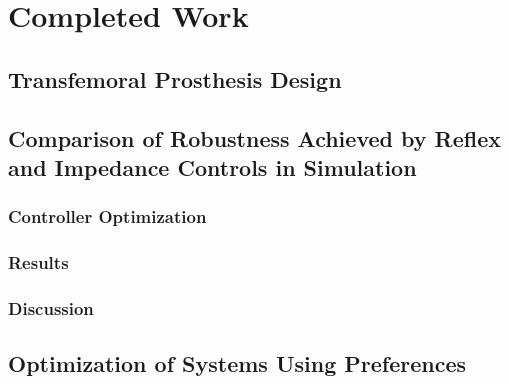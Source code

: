 \chapter{Completed Work}

\section{Transfemoral Prosthesis Design}
\section{Comparison of Robustness Achieved by Reflex and Impedance Controls in Simulation}

\subsection{Controller Optimization}

\subsection{Results}

\subsection{Discussion}

\section{Optimization of Systems Using Preferences}

